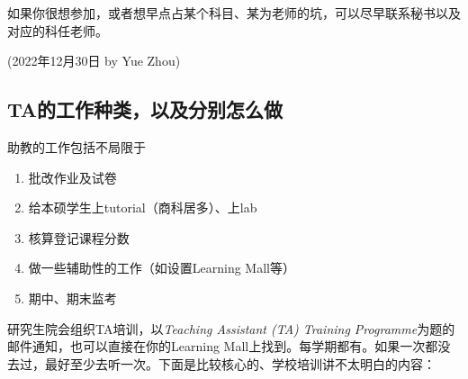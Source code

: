 如果你很想参加，或者想早点占某个科目、某为老师的坑，可以尽早联系秘书以及对应的科任老师。

\begin{flushright}
    (2022年12月30日 by Yue Zhou)
\end{flushright}

\subsection{TA的工作种类，以及分别怎么做}

助教的工作包括不局限于
\begin{enumerate}
    \item 批改作业及试卷
    \item 给本硕学生上tutorial（商科居多）、上lab
    \item 核算登记课程分数
    \item 做一些辅助性的工作（如设置Learning Mall等）
    \item 期中、期末监考
\end{enumerate}

研究生院会组织TA培训，以\textit{Teaching Assistant (TA) Training Programme}为题的邮件通知，也可以直接在你的Learning Mall上找到。每学期都有。如果一次都没去过，最好至少去听一次。下面是比较核心的、学校培训讲不太明白的内容：

